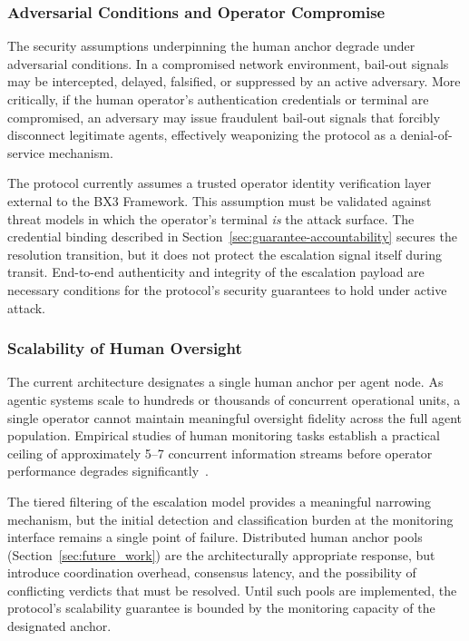 \subsubsection{Adversarial Conditions and Operator Compromise}

The security assumptions underpinning the human anchor degrade under adversarial
conditions.  In a compromised network environment, bail-out signals may be
intercepted, delayed, falsified, or suppressed by an active adversary.  More
critically, if the human operator's authentication credentials or terminal are
compromised, an adversary may issue fraudulent bail-out signals that forcibly
disconnect legitimate agents, effectively weaponizing the protocol as a
denial-of-service mechanism.

The protocol currently assumes a trusted operator identity verification layer
external to the BX3 Framework.  This assumption must be validated against threat
models in which the operator's terminal \emph{is} the attack surface.  The
credential binding described in Section~\ref{sec:guarantee-accountability}
secures the resolution transition, but it does not protect the escalation signal
itself during transit.  End-to-end authenticity and integrity of the escalation
payload are necessary conditions for the protocol's security guarantees to hold
under active attack.

\subsubsection{Scalability of Human Oversight}

The current architecture designates a single human anchor per agent node.  As
agentic systems scale to hundreds or thousands of concurrent operational units,
a single operator cannot maintain meaningful oversight fidelity across the full
agent population.  Empirical studies of human monitoring tasks establish a
practical ceiling of approximately 5--7 concurrent information streams before
operator performance degrades significantly~\cite{wickens2008multiple}.

The tiered filtering of the escalation model provides a meaningful narrowing
mechanism, but the initial detection and classification burden at the monitoring
interface remains a single point of failure.  Distributed human anchor pools
(Section~\ref{sec:future_work}) are the architecturally appropriate response, but
introduce coordination overhead, consensus latency, and the possibility of
conflicting verdicts that must be resolved.  Until such pools are implemented,
the protocol's scalability guarantee is bounded by the monitoring capacity of
the designated anchor.


